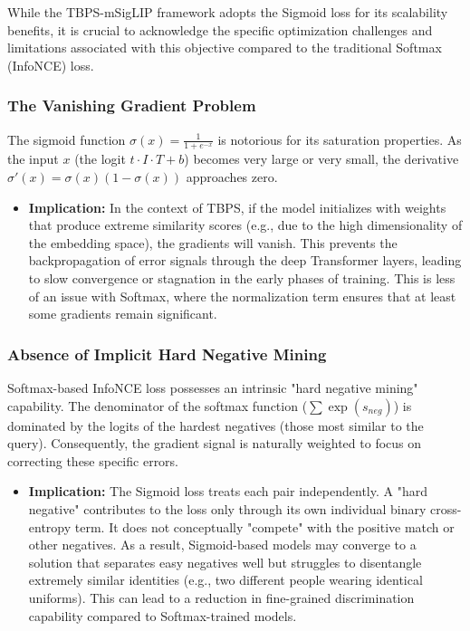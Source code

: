 \documentclass[../main.tex]{subfiles}
\begin{document}
\noindent While the TBPS-mSigLIP framework adopts the Sigmoid loss for its scalability benefits, it is crucial to acknowledge the specific optimization challenges and limitations associated with this objective compared to the traditional Softmax (InfoNCE) loss.

\subsubsection{The Vanishing Gradient Problem}

\noindent The sigmoid function $\sigma(x) = \frac{1}{1+e^{-x}}$ is notorious for its saturation properties. As the input $x$ (the logit $t \cdot I \cdot T + b$) becomes very large or very small, the derivative $\sigma'(x) = \sigma(x)(1 - \sigma(x))$ approaches zero.

\begin{itemize}
    \item \textbf{Implication:} In the context of TBPS, if the model initializes with weights that produce extreme similarity scores (e.g., due to the high dimensionality of the embedding space), the gradients will vanish. This prevents the backpropagation of error signals through the deep Transformer layers, leading to slow convergence or stagnation in the early phases of training. This is less of an issue with Softmax, where the normalization term ensures that at least some gradients remain significant.
\end{itemize}

\subsubsection{Absence of Implicit Hard Negative Mining}

\noindent Softmax-based InfoNCE loss possesses an intrinsic "hard negative mining" capability. The denominator of the softmax function ($\sum \exp(s_{neg})$) is dominated by the logits of the hardest negatives (those most similar to the query). Consequently, the gradient signal is naturally weighted to focus on correcting these specific errors.

\begin{itemize}
    \item \textbf{Implication:} The Sigmoid loss treats each pair independently. A "hard negative" contributes to the loss only through its own individual binary cross-entropy term. It does not conceptually "compete" with the positive match or other negatives. As a result, Sigmoid-based models may converge to a solution that separates easy negatives well but struggles to disentangle extremely similar identities (e.g., two different people wearing identical uniforms). This can lead to a reduction in fine-grained discrimination capability compared to Softmax-trained models.
\end{itemize}
\end{document}

